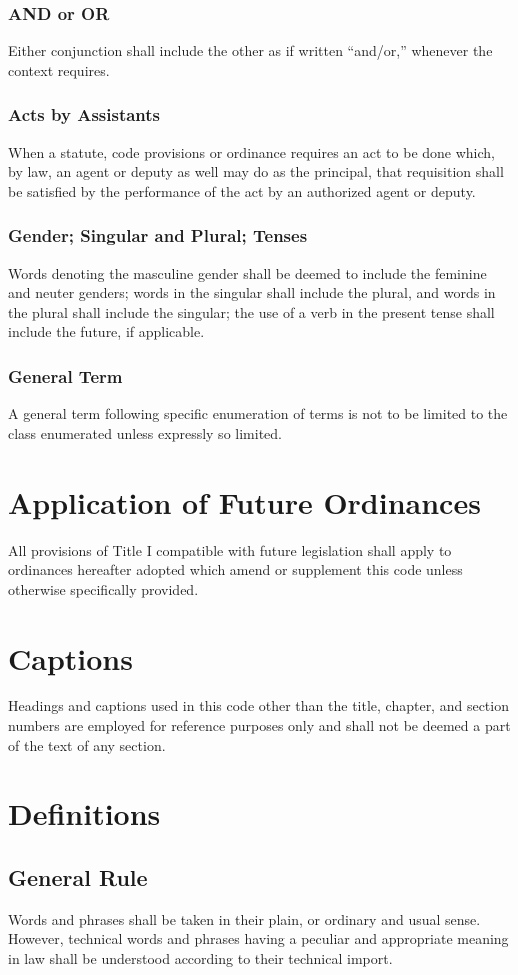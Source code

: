 \subsubsection{AND or OR}
Either conjunction shall include the other as if written “and/or,” whenever the context requires.
\subsubsection{Acts by Assistants}
When a statute, code provisions or ordinance requires an act to be done which, by law, an agent or deputy as well may do as the principal, that requisition shall be satisfied by the performance of the act by an authorized agent or deputy.
\subsubsection{Gender; Singular and Plural; Tenses}
Words denoting the masculine gender shall be deemed to include the feminine and neuter genders; words in the singular shall include the plural, and words in the plural shall include the singular; the use of a verb in the present tense shall include the future, if applicable.
\subsubsection{General Term}
A general term following specific enumeration of terms is not to be limited to the class enumerated unless expressly so limited.


\section{Application of Future Ordinances}
All provisions of Title I compatible with future legislation shall apply to ordinances hereafter adopted which amend or supplement this code unless otherwise specifically provided.


\section{Captions}
Headings and captions used in this code other than the title, chapter, and section numbers are employed for reference purposes only and shall not be deemed a part of the text of any section.


\section{Definitions}
\subsection{General Rule}
Words and phrases shall be taken in their plain, or ordinary and usual sense.  However, technical words and phrases having a peculiar and appropriate meaning in law shall be understood according to their technical import.
